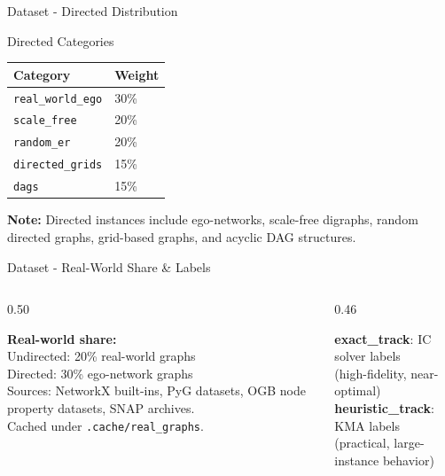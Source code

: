 \documentclass[aspectratio=169]{beamer}
\renewcommand{\footnotesize}{\tiny}
\begin{document}
\begin{frame}{Dataset - Directed Distribution}
	\small
	\begin{block}{Directed Categories}
		\begin{tabular}{ll}
			\toprule
			Category                  & Weight \\
			\midrule
			\texttt{real\_world\_ego} & 30\%   \\
			\texttt{scale\_free}      & 20\%   \\
			\texttt{random\_er}       & 20\%   \\
			\texttt{directed\_grids}  & 15\%   \\
			\texttt{dags}             & 15\%   \\
			\bottomrule
		\end{tabular}
	\end{block}
	\vspace{0.3cm}
	\begin{tcolorbox}[greenbox,fontupper=\footnotesize]
		\textbf{Note:} Directed instances include ego-networks,
		scale-free digraphs, random directed graphs, grid-based graphs,
		and acyclic DAG structures.
	\end{tcolorbox}
\end{frame}

\begin{frame}{Dataset - Real-World Share \& Labels}
	\small
	\begin{columns}[T]
		\begin{column}{0.50\textwidth}
			\begin{tcolorbox}[greenbox,fontupper=\footnotesize]
				\textbf{Real-world share:}\\
				Undirected: 20\% real-world graphs\\
				Directed: 30\% ego-network graphs\\[3pt]
				Sources: NetworkX built-ins, PyG datasets,
				OGB node property datasets, SNAP archives.\\[3pt]
				Cached under \texttt{.cache/real\_graphs}.
			\end{tcolorbox}
		\end{column}
		\begin{column}{0.46\textwidth}
			\begin{tcolorbox}[algbox,title=Label Sources]
				\footnotesize
				\textbf{exact\_track}: IC solver labels\\
				(high-fidelity, near-optimal)\\[3pt]
				\textbf{heuristic\_track}: KMA labels\\
				(practical, large-instance behavior)
			\end{tcolorbox}
		\end{column}
	\end{columns}
\end{frame}
\end{document}
